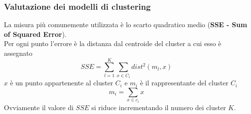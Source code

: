 \documentclass[../main.tex]{subfiles}
\begin{document}
	\subsubsection{Valutazione dei modelli di clustering}
	La misura più comunemente utilizzata è lo scarto quadratico medio (\textbf{SSE - Sum of Squared Error}). \\
	Per ogni punto l’errore è la distanza dal centroide del cluster a cui esso è assegnato
	\[SSE = \sum_{l = 1}^{K} \sum_{x \in C_i} dist^2 (m_l , x)\]
	$x$ è un punto appartenente al cluster $C_i$ e $m_i$ è il rappresentante del cluster $C_i$
	\[m_i = \sum_{x \in c_i} x\]
	Ovviamente il valore di $SSE$ si riduce incrementando il numero dei cluster $K$.
\end{document}
